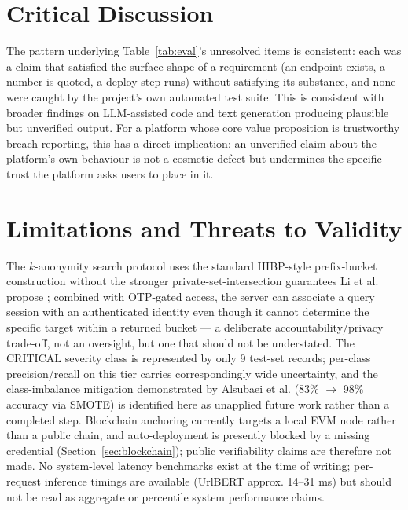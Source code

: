 \documentclass[conference]{IEEEtran}
\begin{document}
\section{Critical Discussion}
The pattern underlying Table~\ref{tab:eval}'s unresolved items is consistent: each was a claim that satisfied the surface shape of a requirement (an endpoint exists, a number is quoted, a deploy step runs) without satisfying its substance, and none were caught by the project's own automated test suite. This is consistent with broader findings on LLM-assisted code and text generation producing plausible but unverified output. For a platform whose core value proposition is trustworthy breach reporting, this has a direct implication: an unverified claim about the platform's own behaviour is not a cosmetic defect but undermines the specific trust the platform asks users to place in it.

\section{Limitations and Threats to Validity}
\label{sec:limitations}
The $k$-anonymity search protocol uses the standard HIBP-style prefix-bucket construction without the stronger private-set-intersection guarantees Li et al. propose \cite{li2019protocols}; combined with OTP-gated access, the server can associate a query session with an authenticated identity even though it cannot determine the specific target within a returned bucket --- a deliberate accountability/privacy trade-off, not an oversight, but one that should not be understated. The CRITICAL severity class is represented by only 9 test-set records; per-class precision/recall on this tier carries correspondingly wide uncertainty, and the class-imbalance mitigation demonstrated by Alsubaei et al. \cite{alsubaei2024enhancing} (83\% $\to$ 98\% accuracy via SMOTE) is identified here as unapplied future work rather than a completed step. Blockchain anchoring currently targets a local EVM node rather than a public chain, and auto-deployment is presently blocked by a missing credential (Section~\ref{sec:blockchain}); public verifiability claims are therefore not made. No system-level latency benchmarks exist at the time of writing; per-request inference timings are available (UrlBERT approx. 14--31 ms) but should not be read as aggregate or percentile system performance claims.
\end{document}
